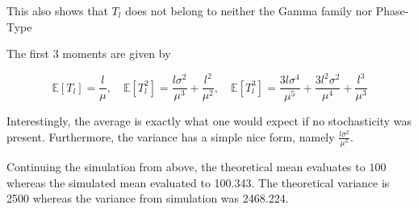 \documentclass[../Thesis.tex]{subfiles}
\begin{document}
This also shows that $T_l$ does not belong to neither the Gamma family nor Phase-Type

The first 3 moments are given by

$$\mathbb{E}\left[T_l\right] = \frac{l}{\mu} , \quad \mathbb{E}\left[T_l^2\right] = \frac{l \sigma^2}{\mu^3} + \frac{l^2}{\mu^2} , \quad \mathbb{E}\left[T_l^3\right] = \frac{3l \sigma^4}{\mu^5} + \frac{3 l^2 \sigma^2}{\mu^4} + \frac{l^3}{\mu^3}$$

Interestingly, the average is exactly what one would expect if no stochasticity was present. Furthermore, the variance has a simple nice form, namely $\frac{l \sigma^2}{\mu^3}$.

Continuing the simulation from above, the theoretical mean evaluates to $100$ whereas the simulated mean evaluated to 100.343. The theoretical variance is 2500 whereas the variance from simulation was 2468.224.

\end{document}
